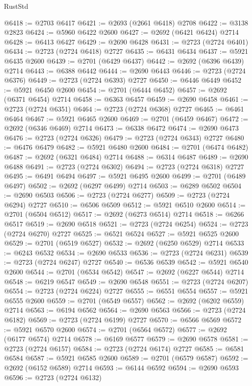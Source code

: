 \begin{lexlean}{RustStd}
\begin{coremodule}
@6418 := @2703 @6417
@6421 := @2693 (@2661 @6418) @2708
@6422 := @3138 @2823
@6424 := @5960 @6422 @2600
@6427 := @2692 (@6421 @6424) @2714
@6428 := @6413 @6427
@6429 := @2690 @6428
@6431 := @2723 (@2724 @6401)
@6434 := @2723 (@2724 @6418) @2727
@6435 := @6431 @6434
@6437 := @5921 @6435 @2600
@6439 := @2701 (@6429 @6437)
@6442 := @2692 (@6396 @6439) @2714
@6443 := @6388 @6442
@6444 := @2690 @6443
@6446 := @2723 (@2724 @6376)
@6449 := @2723 (@2724 @6393) @2727
@6450 := @6446 @6449
@6452 := @5921 @6450 @2600
@6454 := @2701 (@6444 @6452)
@6457 := @2692 (@6371 @6454) @2714
@6458 := @6363 @6457
@6459 := @2690 @6458
@6461 := @2723 (@2724 @6351)
@6464 := @2723 (@2724 @6368) @2727
@6465 := @6461 @6464
@6467 := @5921 @6465 @2600
@6469 := @2701 (@6459 @6467)
@6472 := @2692 (@6346 @6469) @2714
@6473 := @6338 @6472
@6474 := @2690 @6473
@6476 := @2723 (@2724 @6326)
@6479 := @2723 (@2724 @6343) @2727
@6480 := @6476 @6479
@6482 := @5921 @6480 @2600
@6484 := @2701 (@6474 @6482)
@6487 := @2692 (@6321 @6484) @2714
@6488 := @6314 @6487
@6489 := @2690 @6488
@6491 := @2723 (@2724 @6302)
@6494 := @2723 (@2724 @6318) @2727
@6495 := @6491 @6494
@6497 := @5921 @6495 @2600
@6499 := @2701 (@6489 @6497)
@6502 := @2692 (@6297 @6499) @2714
@6503 := @6289 @6502
@6504 := @2690 @6503
@6506 := @2723 (@2724 @6277)
@6509 := @2723 (@2724 @6294) @2727
@6510 := @6506 @6509
@6512 := @5921 @6510 @2600
@6514 := @2701 (@6504 @6512)
@6517 := @2692 (@6273 @6514) @2714
@6518 := @6266 @6517
@6519 := @2690 @6518
@6521 := @2723 (@2724 @6254)
@6524 := @2723 (@2724 @6270) @2727
@6525 := @6521 @6524
@6527 := @5921 @6525 @2600
@6529 := @2701 (@6519 @6527)
@6532 := @2692 (@6250 @6529) @2714
@6533 := @6243 @6532
@6534 := @2690 @6533
@6536 := @2723 (@2724 @6231)
@6539 := @2723 (@2724 @6247) @2727
@6540 := @6536 @6539
@6542 := @5921 @6540 @2600
@6544 := @2701 (@6534 @6542)
@6547 := @2692 (@6227 @6544) @2714
@6548 := @6219 @6547
@6549 := @2690 @6548
@6551 := @2723 (@2724 @6207)
@6554 := @2723 (@2724 @6224) @2727
@6555 := @6551 @6554
@6557 := @5921 @6555 @2600
@6559 := @2701 (@6549 @6557)
@6562 := @2692 (@6202 @6559) @2714
@6563 := @6194 @6562
@6564 := @2690 @6563
@6566 := @2723 (@2724 @6182)
@6569 := @2723 (@2724 @6199) @2727
@6570 := @6566 @6569
@6572 := @5921 @6570 @2600
@6574 := @2701 (@6564 @6572)
@6577 := @2692 (@6177 @6574) @2714
@6578 := @6169 @6577
@6579 := @2690 @6578
@6581 := @2723 (@2724 @6157)
@6584 := @2723 (@2724 @6174) @2727
@6585 := @6581 @6584
@6587 := @5921 @6585 @2600
@6589 := @2701 (@6579 @6587)
@6592 := @2692 (@6152 @6589) @2714
@6593 := @6144 @6592
@6594 := @2690 @6593
@6596 := @2723 (@2724 @6132)

\end{coremodule}
\end{lexlean}
